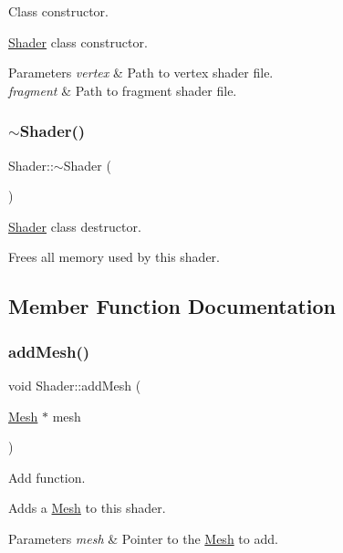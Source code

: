 Class constructor. 

\hyperlink{class_shader}{Shader} class constructor.


\begin{DoxyParams}{Parameters}
{\em vertex} & Path to vertex shader file. \\
\hline
{\em fragment} & Path to fragment shader file. \\
\hline
\end{DoxyParams}
\mbox{\label{class_shader_aff01df87e8a102f270b5b135a295e59d}} 
\subsubsection{\texorpdfstring{$\sim$\+Shader()}{~Shader()}}
{\footnotesize\ttfamily Shader\+::$\sim$\+Shader (\begin{DoxyParamCaption}{ }\end{DoxyParamCaption})}



\hyperlink{class_shader}{Shader} class destructor. 

Frees all memory used by this shader. 

\subsection{Member Function Documentation}
\mbox{\label{class_shader_ab6af37727a2f0a0e5f31fb05e9137853}} 
\subsubsection{\texorpdfstring{add\+Mesh()}{addMesh()}}
{\footnotesize\ttfamily void Shader\+::add\+Mesh (\begin{DoxyParamCaption}\item[{\hyperlink{class_mesh}{Mesh} $\ast$}]{mesh }\end{DoxyParamCaption})}



Add function. 

Adds a \hyperlink{class_mesh}{Mesh} to this shader.


\begin{DoxyParams}{Parameters}
{\em mesh} & Pointer to the \hyperlink{class_mesh}{Mesh} to add. \\
\hline
\end{DoxyParams}
\mbox{\label{class_shader_ae39ec6d01ef565e170cce67c75d3fa3d}} 
